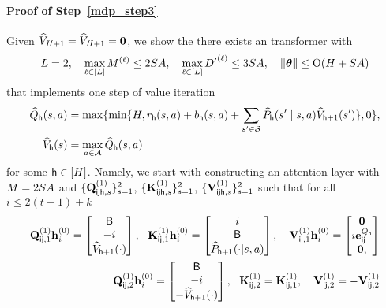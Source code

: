 \paragraph{Proof of Step~\ref{mdp_step3}} Given ${\widehat{{{V}}}}_{{H}+1}={\widehat{{{V}}}}_{{H}+1}={\mathbf 0}$, we show the there exists an transformer with
\begin{align*}
{L}=2,~~~\max_{\ell\in[{L}]}{M}^{(\ell)}\leq2{S}{A},~~~\max_{\ell\in[{L}]}{D'}^{{(\ell)}}\leq3{S}{A},~~~{\left|\!\left|\!\left|{{{\boldsymbol \theta}}}\right|\!\right|\!\right|}\leq {\mathrm{O}}({H}+{S}{A})
\end{align*}
that implements one step of value iteration
\begin{align*}
    {\widehat{{Q}}}_{\mathsf{h}}({s},{a})&=\max\{\min\{{H},{{r}}_{\mathsf{h}}({s},{a})+{b}_{\mathsf{h}}({s},{a})+\sum_{{s}'\in{\mathcal{S}}}\widehat{P}_{\mathsf{h}}({s}'\mid{s},{a}){\widehat{{{V}}}}_{{\mathsf{h}}+1}({s}')\},0\},\\
{\widehat{{{V}}}}_{\mathsf{h}}({s})&=\max_{{a}\in{\mathcal{A}}}{\widehat{{Q}}}_{\mathsf{h}}({s},{a})
\end{align*} for some ${\mathsf{h}}\in[{H}]$.
Namely, we start with constructing an-attention layer with ${M}=2{S}{A}$ and $\{{\mathbf Q}_{{\mathsf{i}}{\mathsf{j}}{\mathsf{h}},s}^{(1)}\}^2_{s=1}$, $\{{\mathbf K}_{{\mathsf{i}}{\mathsf{j}}{\mathsf{h}},s}^{(1)}\}^2_{s=1}$, $\{{\mathbf V}_{{\mathsf{i}}{\mathsf{j}}{\mathsf{h}},s}^{(1)}\}^2_{s=1}$ such that for all $i\leq 2(t-1)+k$
\begin{align*}
   {\mathbf Q}_{{\mathsf{i}}{\mathsf{j}},1}^{(1)}{\mathbf h}_i^{(0)} =\begin{bmatrix}
       {\mathsf{B}}\\-i\\
       {\widehat{{{V}}}}_{{\mathsf{h}}+1}(\cdot)\\
   \end{bmatrix},~~ {\mathbf K}_{{\mathsf{i}}{\mathsf{j}},1}^{(1)}{\mathbf h}_i^{(0)} =\begin{bmatrix}
       i\\ {\mathsf{B}}\\
       \widehat{P}_{{\mathsf{h}}+1}(\cdot|{s},{a})\\
   \end{bmatrix},~~~
   {\mathbf V}_{{\mathsf{i}}{\mathsf{j}},1}^{(1)}{\mathbf h}_i^{(0)} =\begin{bmatrix}
       {\mathbf 0} \\ i{\mathbf e}^{{Q}_{\mathsf{h}}}_{{\mathsf{i}}{\mathsf{j}}}\\
       {\mathbf 0},
   \end{bmatrix}
   \\
    {\mathbf Q}_{{\mathsf{i}}{\mathsf{j}},2}^{(1)}{\mathbf h}_i^{(0)} =\begin{bmatrix}
       {\mathsf{B}}\\-i\\
       -{\widehat{{{V}}}}_{{\mathsf{h}}+1}(\cdot)\\
   \end{bmatrix},~~ {\mathbf K}_{{\mathsf{i}}{\mathsf{j}},2}^{(1)}={\mathbf K}_{{\mathsf{i}}{\mathsf{j}},1}^{(1)},~~~
{\mathbf V}_{{\mathsf{i}}{\mathsf{j}},2}^{(1)}=-{\mathbf V}_{{\mathsf{i}}{\mathsf{j}},2}^{(1)}
\end{align*}
